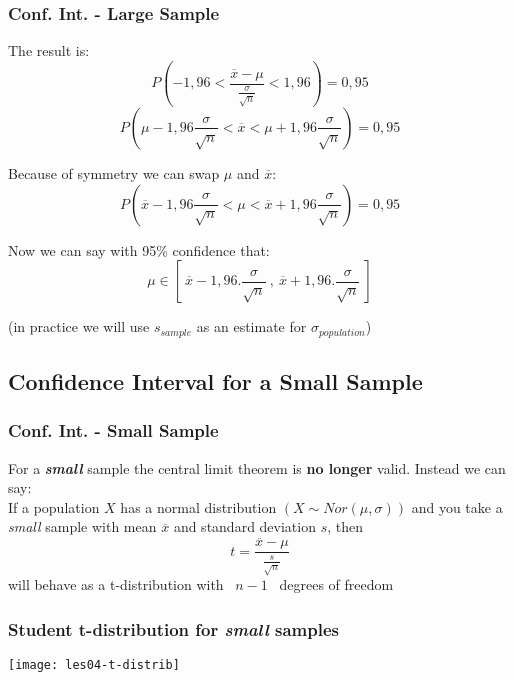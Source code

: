 \documentclass[aspectratio=169]{beamer}
\begin{document}
\begin{frame}
  \frametitle{Conf. Int. - Large Sample}
  
  The result is:
  \[ P\left(-1,96 < \frac{\overline{x} - \mu}{\frac{\sigma}{\sqrt{n}}} < 1,96 \right) = 0,95 \]
  \[ P\left( \mu-1,96 \frac{\sigma}{\sqrt{n}} < \overline{x} < \mu+1,96 \frac{\sigma}{\sqrt{n}} \right)  = 0,95 \]
  
  Because of symmetry we can swap $\mu$ and $\overline{x}$:
  \[ P\left( \overline{x}-1,96 \frac{\sigma}{\sqrt{n}} < \mu < \overline{x}+1,96 \frac{\sigma}{\sqrt{n}} \right)  = 0,95 \]
  
  Now we can say with 95\% confidence that:
  \[ \mu \in \left[~\overline{x}-1,96.\frac{\sigma}{\sqrt{n}}~,~\overline{x}+1,96. \frac{\sigma}{\sqrt{n}}~\right] \]
  
  \small (in practice we will use $s_{sample}$ as an estimate for $\sigma_{population}$)
  
\end{frame}

\subsection{Confidence Interval for a Small Sample}

\begin{frame}
  \frametitle{Conf. Int. - Small Sample}
  For a \textit{\textbf{small}} sample the central limit theorem is \textbf{no longer} valid.
  \vfill
  Instead we can say:\\
  \vfill
  If a population $X$ has a normal distribution $(X \sim Nor(\mu,\sigma))$
  and you take a \textit{small} sample with mean $\overline{x}$ and standard deviation $s$, 
  then
  \[ t = \frac{\overline{x} - \mu}{\frac{s}{\sqrt{n}}} \]
  will behave as a t-distribution with ~$n-1$~ degrees of freedom
  
\end{frame}

\begin{frame}
  \frametitle{Student t-distribution for \textit{small} samples}
  \bigskip
  \centering
  \texttt{[image: les04-t-distrib]}
\end{frame}
\end{document}

